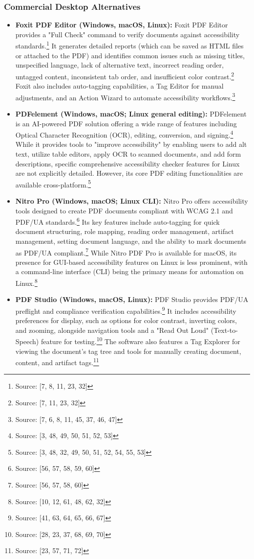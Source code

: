 \subsubsection{Commercial Desktop Alternatives}
\begin{itemize}[noitemsep,topsep=0pt]
    \item \textbf{Foxit PDF Editor (Windows, macOS, Linux):} Foxit PDF Editor provides a "Full Check" command to verify documents against accessibility standards.\footnote{Source: [7, 8, 11, 23, 32]} It generates detailed reports (which can be saved as HTML files or attached to the PDF) and identifies common issues such as missing titles, unspecified language, lack of alternative text, incorrect reading order, untagged content, inconsistent tab order, and insufficient color contrast.\footnote{Source: [7, 11, 23, 32]} Foxit also includes auto-tagging capabilities, a Tag Editor for manual adjustments, and an Action Wizard to automate accessibility workflows.\footnote{Source: [7, 6, 8, 11, 45, 37, 46, 47]}
    \item \textbf{PDFelement (Windows, macOS; Linux general editing):} PDFelement is an AI-powered PDF solution offering a wide range of features including Optical Character Recognition (OCR), editing, conversion, and signing.\footnote{Source: [3, 48, 49, 50, 51, 52, 53]} While it provides tools to "improve accessibility" by enabling users to add alt text, utilize table editors, apply OCR to scanned documents, and add form descriptions, specific comprehensive accessibility checker features for Linux are not explicitly detailed. However, its core PDF editing functionalities are available cross-platform.\footnote{Source: [3, 48, 32, 49, 50, 51, 52, 54, 55, 53]}
    \item \textbf{Nitro Pro (Windows, macOS; Linux CLI):} Nitro Pro offers accessibility tools designed to create PDF documents compliant with WCAG 2.1 and PDF/UA standards.\footnote{Source: [56, 57, 58, 59, 60]} Its key features include auto-tagging for quick document structuring, role mapping, reading order management, artifact management, setting document language, and the ability to mark documents as PDF/UA compliant.\footnote{Source: [56, 57, 58, 60]} While Nitro PDF Pro is available for macOS, its presence for GUI-based accessibility features on Linux is less prominent, with a command-line interface (CLI) being the primary means for automation on Linux.\footnote{Source: [10, 12, 61, 48, 62, 32]}
    \item \textbf{PDF Studio (Windows, macOS, Linux):} PDF Studio provides PDF/UA preflight and compliance verification capabilities.\footnote{Source: [41, 63, 64, 65, 66, 67]} It includes accessibility preferences for display, such as options for color contrast, inverting colors, and zooming, alongside navigation tools and a "Read Out Loud" (Text-to-Speech) feature for testing.\footnote{Source: [28, 23, 37, 68, 69, 70]} The software also features a Tag Explorer for viewing the document's tag tree and tools for manually creating document, content, and artifact tags.\footnote{Source: [23, 57, 71, 72]}

\end{itemize}
